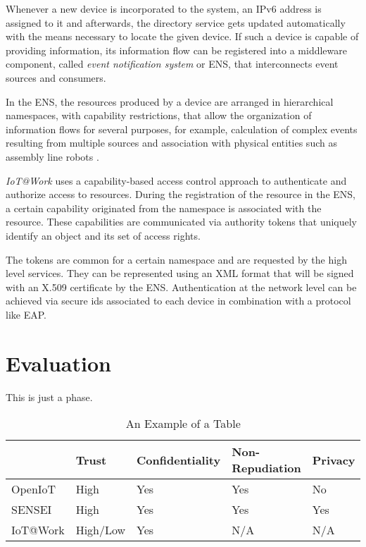 \documentclass[journal]{IEEEtran}
\begin{document}
  Whenever a new device is incorporated to the system, an IPv6 address is assigned to it and afterwards, the directory service gets updated automatically with the means necessary to locate the given device. If such a device is capable of providing information, its information flow can be registered into a middleware component, called \emph{event notification system} or ENS, that interconnects event sources and consumers. 

  In the ENS, the resources produced by a device are arranged in hierarchical namespaces, with capability restrictions, that allow the organization of information flows for several purposes, for example, calculation of complex events resulting from multiple sources and association with physical entities such as assembly line robots \cite{Trsek2013}.

  \emph{IoT@Work} uses a capability-based access control approach to authenticate and authorize access to resources. During the registration of the resource in the ENS, a certain capability originated from the namespace is associated with the resource. These capabilities are communicated via authority tokens that uniquely identify an object and its set of access rights.

  The tokens are common for a certain namespace and are requested by the high level services. They can be represented using an XML format that will be signed with an X.509 certificate by the ENS. Authentication at the network level can be achieved via secure ids associated to each device in combination with a protocol like EAP.

\section{Evaluation}
  This is just a phase.
  \begin{table}[!t]    
    \renewcommand{\arraystretch}{1.3}    
    \caption{An Example of a Table}
    \label{evaluation_table}        
    \begin{tabu} to \columnwidth {X[0.6,l]X[0.5,c]X[,c]X[,c]X[0.3,c]}
      \hline      
                   & Trust      & Confidentiality & Non-Repudiation & Privacy \\
      \hline
      OpenIoT      & High       & Yes             & Yes             & No      \\
      SENSEI       & High       & Yes             & Yes             & Yes     \\
      IoT@Work     & High/Low   & Yes             & N/A             & N/A     \\ 
      \hline      
    \end{tabu}
  \end{table}
  
\end{document}

